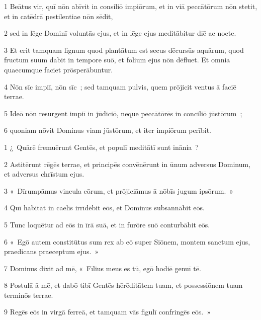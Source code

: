 



\psalmVerse
  {\phantom{00}1}
  {Beātus vir, quī nōn abīvit in consiliō impiōrum, et in viā peccātōrum nōn stetit, et in catēdrā pestilentiae nōn sēdit,}


\psalmVerse
  {\phantom{00}2}
  {sed in lēge Dominī voluntās ejus, et in lēge ejus meditābitur diē ac nocte.}


\psalmVerse
  {\phantom{00}3}
  {Et erit tamquam lignum quod plantātum est secus dēcursūs aquārum, quod fructum suum dabit in tempore suō, et folium ejus nōn dēfluet. Et omnia quaecumque faciet prōsperābuntur.}


\psalmVerse
  {\phantom{00}4}
  {Nōn sīc impiī, nōn sīc~; sed tamquam pulvis, quem prōjicit ventus ā faciē terrae.}


\psalmVerse
  {\phantom{00}5}
  {Ideō nōn resurgent impiī in jūdiciō, neque peccātōrēs in conciliō jūstōrum~;}


\psalmVerse
  {\phantom{00}6}
  {quoniam nōvit Dominus viam jūstōrum, et iter impiōrum perībit.}



\psalmVerse
  {\phantom{00}1}
  {¿~Quārē fremuērunt Gentēs, et populī meditātī sunt inānia~?}


\psalmVerse
  {\phantom{00}2}
  {Astitērunt rēgēs terrae, et principēs convēnērunt in ūnum adversus Dominum, et adversus chrīstum ejus.}


\psalmVerse
  {\phantom{00}3}
  {«~Dīrumpāmus vincula eōrum, et prōjiciāmus ā nōbīs jugum ipsōrum.~»}


\psalmVerse
  {\phantom{00}4}
  {Quī habitat in caelīs irrīdēbit eōs, et Dominus subsannābit eōs.}


\psalmVerse
  {\phantom{00}5}
  {Tunc loquētur ad eōs in īrā suā, et in furōre suō conturbābit eōs.}


\psalmVerse
  {\phantom{00}6}
  {«~Egō autem constitūtus sum rex ab eō super Siōnem, montem sanctum ejus, praedicans praeceptum ejus.~»}


\psalmVerse
  {\phantom{00}7}
  {Dominus dixit ad mē, «~Fīlius meus es tū, egō hodiē genuī tē.}


\psalmVerse
  {\phantom{00}8}
  {Postulā ā mē, et dabō tibī Gentēs hērēditātem tuam, et possessiōnem tuam terminōs terrae.}


\psalmVerse
  {\phantom{00}9}
  {Regēs eōs in virgā ferreā, et tamquam vās figulī confringēs eōs.~»}


